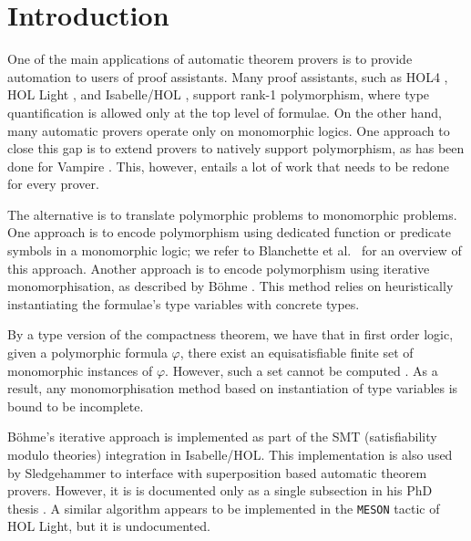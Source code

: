\documentclass[]{ceurart}
\begin{document}
\maketitle

\section{Introduction}

One of the main applications of automatic theorem provers is to provide automation to users of proof assistants. Many proof assistants, such as HOL4 \cite{slind-norrish-2008}, HOL Light \cite{harrison-2009}, and
Isabelle/HOL \cite{nipkow-et-al-2002}, support rank-1 polymorphism, where type quantification is allowed only at the top level of formulae. On the other hand, many automatic provers operate only on monomorphic logics. One approach to close this gap is to extend provers to natively support polymorphism, as has been done for Vampire \cite{bhayat-reger-2020}. This, however, entails a lot of work that needs to be redone for every prover.

The alternative is to translate polymorphic problems to monomorphic problems.
One approach is to encode polymorphism using dedicated function or predicate symbols in a monomorphic logic;
we refer to Blanchette et al.\ \cite[Section~9]{mono-trans} for an overview of this approach.
Another approach is to encode polymorphism using {iterative monomorphisation}, as described by B\"ohme \cite[Section 2.2.1]{sb-phd}. This method relies on heuristically instantiating the formulae's type variables with concrete types.

By a type version of the compactness theorem, we have that in first order logic, given a polymorphic formula \(\varphi\), there exist an equisatisfiable finite set of monomorphic instances of \(\varphi\). However, such a set cannot be computed \cite[Theorem 1]{expr-poly-types}. As a result, any monomorphisation method based on instantiation of type variables is
bound to be incomplete.

B\"ohme's iterative approach is implemented as part of the SMT (satisfiability modulo theories) integration \cite[Chapter 2]{sb-phd} in Isabelle/HOL. This implementation is also used by Sledgehammer \cite{judgement, hammer} to interface with superposition based automatic theorem provers. However, it is is documented only as a single subsection in his PhD thesis \cite[Section 2.2.1]{sb-phd}.
A similar algorithm appears to be implemented in the \texttt{MESON} tactic \cite{harrison-1996} of HOL Light, but it is undocumented.
\end{document}

